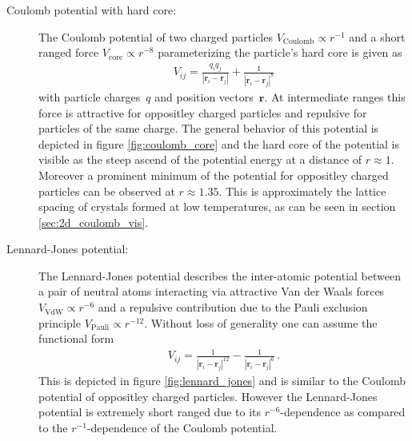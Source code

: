 \documentclass[11pt, a4paper]{article}
\numberwithin{equation}{section}
\begin{document}
\begin{description}
	\item[Coulomb potential with hard core:]
		The Coulomb potential of two charged particles $V_\mathrm{Coulomb} \propto r^{-1}$ and a short ranged force $V_\mathrm{core} \propto r^{-8}$ parameterizing the particle's hard core  is given as
		\begin{align*}
			V_{ij} = \frac{q_i q_j}{| \mathbf{r}_i - \mathbf{r}_j |} + \frac{1}{| \mathbf{r}_i - \mathbf{r}_j |^8}
		\end{align*}
		with particle charges~$q$ and position vectors~$\mathbf{r}$.
		At intermediate ranges this force is attractive for oppositley charged particles and repulsive for particles of the same charge.
		The general behavior of this potential is depicted in figure \ref{fig:coulomb_core} and the hard core of the potential is visible as the steep ascend of the potential energy at a distance of $r \approx 1$.
		Moreover a prominent minimum of the potential for oppositley charged particles can be observed at $r \approx 1.35$.
		This is approximately the lattice spacing of crystals formed at low temperatures, as can be seen in section \ref{sec:2d_coulomb_vis}.
		
	\item[Lennard-Jones potential:]
		The Lennard-Jones potential describes the inter-atomic potential between a pair of neutral atoms interacting via attractive Van der Waals forces $V_\mathrm{VdW} \propto r^{-6}$ and a repulsive contribution due to the Pauli exclusion principle $V_\mathrm{Pauli} \propto r^{-12}$.
		Without loss of generality one can assume the functional form
		\begin{align*}
			V_{ij} = \frac{1}{| \mathbf{r}_i - \mathbf{r}_j |^{12}} - \frac{1}{| \mathbf{r}_i - \mathbf{r}_j |^6} \, \text{.}
		\end{align*}
		This is depicted in figure \ref{fig:lennard_jones} and is similar to the Coulomb potential of oppositley charged particles.
		However the Lennard-Jones potential is extremely short ranged due to its $r^{-6}$-dependence as compared to the $r^{-1}$-dependence of the Coulomb potential.
\end{description}
\end{document}
